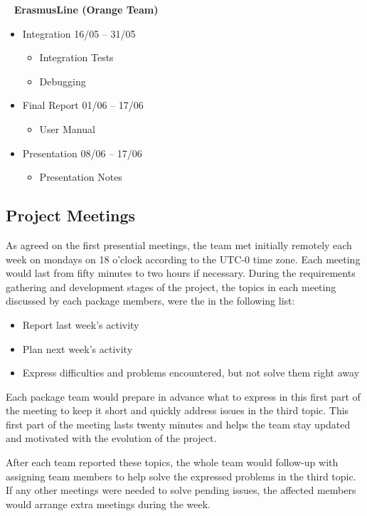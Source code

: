 \ \newline
\textbf{ErasmusLine (Orange Team)} 
\begin{itemize}
 	\item Integration		\hfill16/05	– 31/05
 	\begin{itemize}
 	  \item Integration Tests
 	  \item Debugging
 	 \end{itemize}
	\item Final Report		\hfill01/06 – 17/06
	\begin{itemize}
	  \item User Manual
	\end{itemize}
	\item Presentation	\hfill08/06 – 17/06
	\begin{itemize}
	  \item Presentation Notes
	\end{itemize}
\end{itemize}

\subsection{Project Meetings}

As agreed on the first presential meetings, the team met initially remotely each
week on mondays on 18 o'clock according to the UTC-0 time zone. Each meeting
would last from fifty minutes to two hours if necessary. During the requirements
gathering and development stages of the project, the topics in each meeting
discussed by each package members, were the in the following list:

\begin{itemize}
  \item Report last week's activity 
	\item Plan next week's activity 
	\item Express difficulties and problems encountered, but not solve them right
away
\end{itemize}

Each package team would prepare in advance what to express in this first part of
the meeting to keep it short and quickly address issues in the third
topic. This first part of the meeting lasts twenty minutes and helps the team
stay updated and motivated with the evolution of the project. 

After each team reported these topics, the whole team would follow-up with
assigning team members to help solve the expressed problems in the third topic.
If any other meetings were needed to solve pending issues, the affected members
would arrange extra meetings during the week.

